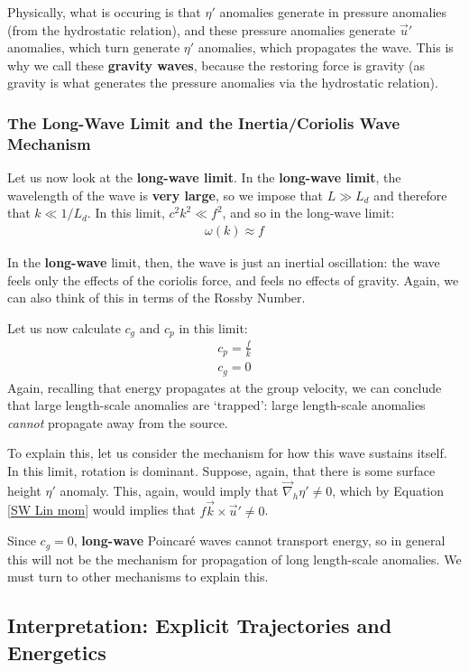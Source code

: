 Physically, what is occuring is that \(\eta'\) anomalies generate in pressure anomalies (from the hydrostatic relation), and these pressure anomalies generate \(\vec{u}'\) anomalies, which turn generate \(\eta'\) anomalies, which propagates the wave. This is why we call these \textbf{gravity waves}, because the restoring force is gravity (as gravity is what generates the pressure anomalies via the hydrostatic relation).

\subsubsection{The Long-Wave Limit and the Inertia/Coriolis Wave Mechanism}

Let us now look at the \textbf{long-wave limit}. In the \textbf{long-wave limit}, the wavelength of the wave is \textbf{very large}, so we impose that \(L\gg L_d\) and therefore that \(k \ll 1/L_d\). In this limit, \(c^2k^2\ll f^2\), and so in the long-wave limit:
\begin{align*}
    \boxed{\omega(k)\approx f}
\end{align*}

In the \textbf{long-wave} limit, then, the wave is just an inertial oscillation: the wave feels only the effects of the coriolis force, and feels no effects of gravity. Again, we can also think of this in terms of the Rossby Number.

Let us now calculate \(c_g\) and \(c_p\) in this limit:
\begin{align*}
    c_p = \frac{f}{k}\\
    c_g = 0
\end{align*}
Again, recalling that energy propagates at the group velocity, we can conclude that large length-scale anomalies are `trapped': large length-scale anomalies \textit{cannot} propagate away from the source. 

To explain this, let us consider the mechanism for how this wave sustains itself. In this limit, rotation is dominant. Suppose, again, that there is some surface height \(\eta'\) anomaly. This, again, would imply that \(\vec{\nabla}_h\eta'\neq 0\), which by Equation \ref{SW Lin mom} would implies that \(f\vec{k}\times\vec{u}'\neq0\).

Since \(c_g=0\), \textbf{long-wave} Poincaré waves cannot transport energy, so in general this will not be the mechanism for propagation of long length-scale anomalies. We must turn to other mechanisms to explain this.

\subsection{Interpretation: Explicit Trajectories and Energetics}

